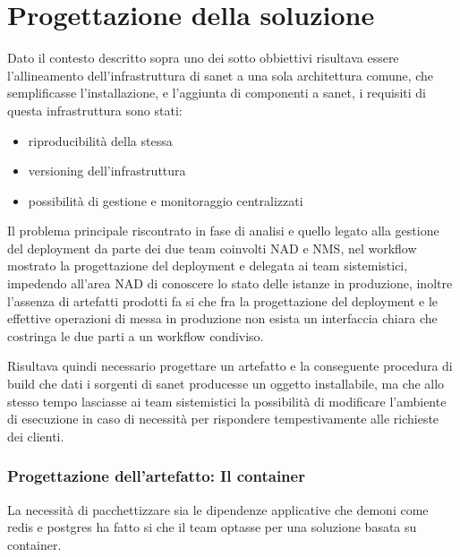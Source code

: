 \chapter{Progettazione della soluzione}

Dato il contesto descritto sopra uno dei sotto obbiettivi risultava essere l'allineamento dell'infrastruttura di sanet a una sola architettura comune, che semplificasse l'installazione, e l'aggiunta di componenti a sanet, i requisiti di questa infrastruttura sono stati:

\begin{itemize}
\item{riproducibilità della stessa}
\item{versioning dell'infrastruttura}
\item{possibilità di gestione e monitoraggio centralizzati}
\end{itemize}
Il problema principale riscontrato in fase di analisi e quello legato alla gestione del deployment da parte dei due team coinvolti NAD e NMS, nel workflow mostrato la progettazione del deployment e delegata ai team sistemistici, impedendo all'area NAD di conoscere lo stato delle istanze in produzione, inoltre l'assenza di artefatti prodotti fa si che fra la progettazione del deployment e le effettive operazioni di messa in produzione non esista un interfaccia chiara che costringa le due parti a un workflow condiviso.

Risultava quindi necessario progettare un artefatto e la conseguente procedura di build che dati i sorgenti di sanet producesse un oggetto installabile, ma che allo stesso tempo lasciasse ai team sistemistici la possibilità di modificare l'ambiente di esecuzione in caso di necessità per rispondere tempestivamente alle richieste dei clienti.

\newpage
\subsection{Progettazione dell'artefatto: Il container}

La necessità di pacchettizzare sia le dipendenze applicative che demoni come redis e postgres ha fatto si che il team optasse per una soluzione basata su container.


